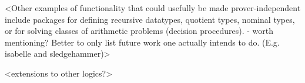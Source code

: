 \documentclass{llncs}
\begin{document}
<Other examples of functionality that could usefully be made prover-independent include packages for defining recursive datatypes, quotient types, nominal types, or for solving classes of arithmetic problems (decision procedures). - worth mentioning? Better to only list future work one actually intends to do. (E.g. isabelle and sledgehammer)>

<extensions to other logics?>



\end{document}
